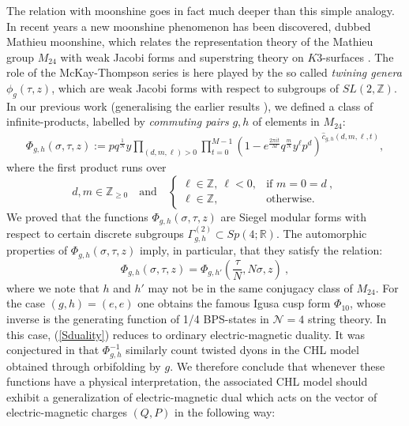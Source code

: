 \documentclass[a4paper,11pt]{article}
\newcommand{\ZZ}{\mathbb{Z}}
\numberwithin{equation}{section}
\def\be{\begin{equation}}
\def\ee{\end{equation}}
\begin{document}
The relation with moonshine goes in fact much deeper than this simple analogy. In recent years a new moonshine phenomenon has been discovered, dubbed Mathieu moonshine, which relates the representation theory of the Mathieu group $M_{24}$ with weak Jacobi forms and superstring theory on $K3$-surfaces \cite{Eguchi:2010ej,Cheng:2010pq,Gaberdiel:2010ch,Taormina:2010pf,Gaberdiel:2010ca,Eguchi:2010fg,Gaberdiel:2011fg,Govindarajan:2011em,Taormina:2011rr,Cheng:2011ay,Eguchi:2011aj,Cheng:2012tq,Gaberdiel:2012gf,Gannon:2012ck,Gaberdiel:2013nya,Taormina:2013mda,Cheng:2013wca,Harrison:2013bya,Creutzig:2013mqa,Gaberdiel:2013psa,Persson:2013xpa}. The role of the McKay-Thompson series is here played by the so called \emph{twining genera} $\phi_g(\tau, z)$, which are weak Jacobi forms with respect to subgroups of $SL(2,\mathbb{Z})$. In our previous work \cite{Persson:2013xpa} (generalising the earlier results \cite{Cheng:2010pq,2012arXiv1208.3453R}), we defined a class of infinite-products, labelled by \emph{commuting pairs} $g,h$ of elements in $M_{24}$:
\begin{align}\label{infprod} \Phi_{g,h}(\sigma,\tau,z):= p q^{\frac{1}{N}} y\prod_{(d,m,\ell)>0}\prod_{t=0}^{M-1}(1-e^{\frac{2\pi it}{M}}q^{\frac{m}{N}}y^\ell p^d)^{\hat c_{g,h}(d,m,\ell ,t)},
\end{align}
where the first product runs over
\be d,m\in\ZZ_{\ge 0}\quad \text{and} \quad \begin{cases} \ell\in\ZZ,\ \ell<0, & \text{if }m=0=d\ ,\\
 \ell\in\ZZ, & \text{otherwise.}
\end{cases}
\ee
We proved that the functions  $\Phi_{g,h}(\sigma,\tau,z)$ are Siegel modular forms with respect to certain discrete subgroups $\Gamma_{g,h}^{(2)}\subset Sp(4;\mathbb{R})$. The automorphic properties of $\Phi_{g,h}(\sigma,\tau,z)$  imply, in particular, that they satisfy the relation: 
\be\label{Sduality} 
\Phi_{g,h}(\sigma,\tau,z)=\Phi_{g,h'}(\frac{\tau}{N},N\sigma,z)\ ,
\ee
where we note that $h$ and $h'$ may not be in the same conjugacy class of $M_{24}$. For the case $(g,h)=(e,e)$ one obtains the famous Igusa cusp form $\Phi_{10}$, whose inverse is the generating function of 1/4 BPS-states in $\mathcal{N}=4$ string theory. In this case, (\ref{Sduality}) reduces to ordinary electric-magnetic duality. It was conjectured in \cite{Persson:2013xpa} that $\Phi_{g,h}^{-1}$ similarly count twisted dyons in the CHL model obtained through orbifolding by $g$. We therefore conclude that whenever these functions have a physical interpretation, the associated CHL model should exhibit a generalization of electric-magnetic dual which acts on the vector of electric-magnetic charges $(Q,P)$ in the following way:
\end{document}
